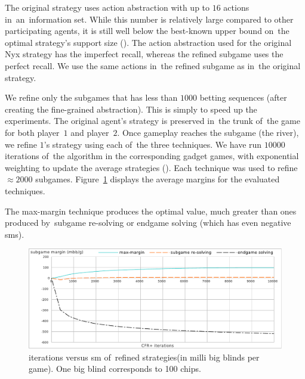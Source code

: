The original strategy uses action abstraction with up to $16$ actions in~an~information set.
While this number is relatively large compared to other participating agents, it is still well below the best-known upper bound on~the optimal strategy's  support size (\cite{Schmid2014bounding}).
The action abstraction used for the original Nyx strategy has the imperfect recall, whereas the refined subgame uses the perfect recall.
We use the same actions in~the refined subgame as in~the original strategy.

We refine only the subgames that has less than $1000$ betting sequences (after creating the fine-grained abstraction).
This is simply to speed up the experiments.
The original agent's strategy is preserved in~the trunk of~the game for both player~$1$ and player~$2$.
Once gameplay reaches the subgame (the river), we refine $1$'s strategy using each of~the three techniques.
We have run $10000$ iterations of~the \cfrplus algorithm in the corresponding gadget games, with exponential weighting to update the average strategies (\cite{Tammelin2015solving}).
Each technique was used to refine $\approx 2000$ subgames.
Figure~\ref{fig:sm-experiments} displays the average margins for the evaluated techniques.

The max-margin technique produces the optimal value, much greater than ones produced by~subgame re-solving or endgame solving (which has even negative \acrlong{sm}s).

\begin{figure}[H]
  \centering
  \includegraphics[width=\textwidth]{../img/sm-experiments}
  \def\captionTitle{\cfrplus iterations versus \acrshort{sm} of~refined strategies}
  \caption[\captionTitle]{\captionTitle (in milli big blinds per game).
    One big blind corresponds to 100 chips.
  }
  \label{fig:sm-experiments}
\end{figure}

